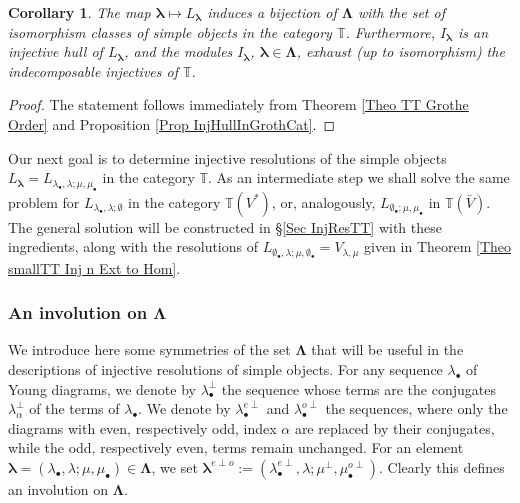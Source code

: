\documentclass[12pt]{article}
\def\TT {{\mathbb T}}     %
\newtheorem{coro}[theorem]{Corollary}
\begin{document}
\begin{coro}\label{Coro TT simples and inj hulls}
The map $\bm\lambda\mapsto L_{\bm\lambda}$ induces a bijection of $\bm\Lambda$ with the set of isomorphism classes of simple objects in the category $\TT$. Furthermore, $I_{\bm\lambda}$ is an injective hull of $L_{\bm\lambda}$, and the modules $I_{\bm\lambda}$, $\bm\lambda\in\bm\Lambda$, exhaust (up to isomorphism) the indecomposable injectives of $\TT$.
\end{coro}

\begin{proof}
The statement follows immediately from Theorem \ref{Theo TT Grothe Order} and Proposition \ref{Prop InjHullInGrothCat}.
\end{proof}

Our next goal is to determine injective resolutions of the simple objects $L_{\bm\lambda}=L_{\lambda_\bullet,\lambda;\mu,\mu_\bullet}$ in the category $\TT$. As an intermediate step we shall solve the same problem for $L_{\lambda_\bullet,\lambda;\emptyset}$ in the category $\TT(V^*)$, or, analogously, $L_{\emptyset_\bullet;\mu,\mu_\bullet}$ in $\TT(\bar V)$. The general solution will be constructed in \S\ref{Sec InjResTT} with these ingredients, along with the resolutions of $L_{\emptyset_\bullet,\lambda;\mu,\emptyset_\bullet}=V_{\lambda,\mu}$ given in Theorem \ref{Theo smallTT Inj n Ext to Hom}.


\subsubsection{An involution on $\bm\Lambda$}\label{Sec InvolutLambdaBeth}

We introduce here some symmetries of the set $\bm\Lambda$ that will be useful in the descriptions of injective resolutions of simple objects. For any sequence $\lambda_\bullet$ of Young diagrams, we denote by $\lambda_\bullet^\perp$ the sequence whose terms are the conjugates $\lambda_\alpha^\perp$ of the terms of $\lambda_\bullet$. We denote by $\lambda_\bullet^{e\perp}$ and $\lambda_\bullet^{o\perp}$ the sequences, where only the diagrams with even, respectively odd, index $\alpha$ are replaced by their conjugates, while the odd, respectively even, terms remain unchanged. For an element $\bm\lambda=(\lambda_\bullet,\lambda;\mu,\mu_\bullet)\in\bm\Lambda$, we set $\bm\lambda^{e\perp o}:=(\lambda_\bullet^{e\perp},\lambda;\mu^\perp,\mu_\bullet^{o\perp})$. Clearly this defines an involution on $\bm\Lambda$.
\end{document}
